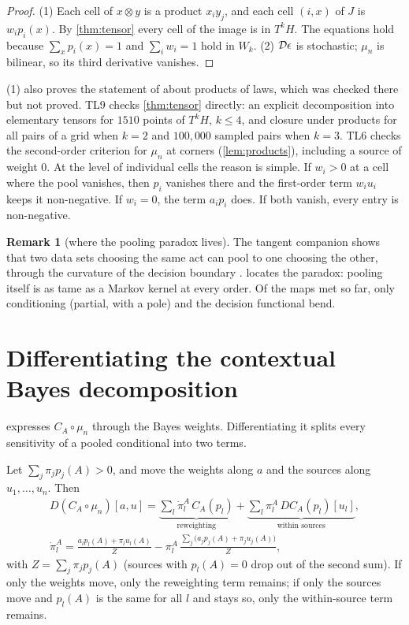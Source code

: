\documentclass[11pt]{article}
\theoremstyle{definition}\newtheorem{definition}[theorem]{Definition}\newtheorem{remark}[theorem]{Remark}\newtheorem{example}[theorem]{Example}
\begin{document}
\begin{proof}
(1) Each cell of $x\otimes y$ is a product $x_iy_j$, and each cell $(i,x)$ of $J$ is $w_ip_i(x)$. By \cref{thm:tensor} every cell of the image
is in $T^kH$. The equations hold because $\sum_xp_i(x)=1$ and $\sum_iw_i=1$ hold in $W_k$. (2) $\mathcal D\epsilon$ is stochastic; $\mu_n$ is bilinear,
so its third derivative vanishes.
\end{proof}

(1) also proves the statement of \cite[Proposition ``morphisms'']{TangentCompanion} about products of laws, which was
checked there but not proved. TL9 checks \cref{thm:tensor} directly: an explicit decomposition into elementary tensors for $1510$
points of $T^kH$, $k\le4$, and closure under products for all pairs of a grid when $k=2$ and $100{,}000$ sampled pairs when $k=3$.
TL6 checks the second-order criterion for $\mu_n$ at corners (\cref{lem:products}), including a source of weight $0$. At the
level of individual cells the reason is simple. If $w_i>0$ at a cell where the pool vanishes, then $p_i$ vanishes there and the first-order
term $w_iu_i$ keeps it non-negative. If $w_i=0$, the term $a_ip_i$ does. If both vanish, every entry is non-negative.

\begin{remark}[where the pooling paradox lives]
The tangent companion shows that two data sets choosing the same act can pool to one choosing the other, through the curvature of the
decision boundary \cite[Proposition ``pooling paradox = curvature'']{TangentCompanion}.  locates the paradox: pooling
itself is as tame as a Markov kernel at every order. Of the maps met so far, only conditioning (partial, with a pole) and the decision
functional bend.
\end{remark}

\section{Differentiating the contextual Bayes decomposition}\label{sec:dbayes}
 expresses $C_A\circ\mu_n$ through the Bayes weights. Differentiating it splits every sensitivity of a pooled conditional
into two terms.

\begin{proposition}\label{prop:dbayes}
Let $\sum_j\pi_jp_j(A)>0$, and move the weights along $a$ and the sources along $u_1,\dots,u_n$. Then
\begin{gather*}
D(C_A\circ\mu_n)[a,u]=\underbrace{\sum_l\dot\pi^A_l\,C_A(p_l)}_{\text{reweighting}}+\underbrace{\sum_l\pi^A_l\,DC_A(p_l)[u_l]}_{\text{within sources}},\\
\dot\pi^A_l=\frac{a_lp_l(A)+\pi_lu_l(A)}{Z}-\pi^A_l\,\frac{\sum_j\bigl(a_jp_j(A)+\pi_ju_j(A)\bigr)}{Z},
\end{gather*}
with $Z=\sum_j\pi_jp_j(A)$ (sources with $p_l(A)=0$ drop out of the second sum). If only the weights move, only the reweighting term remains;
if only the sources move and $p_l(A)$ is the same for all $l$ and stays so, only the within-source term remains.
\end{proposition}
\end{document}
